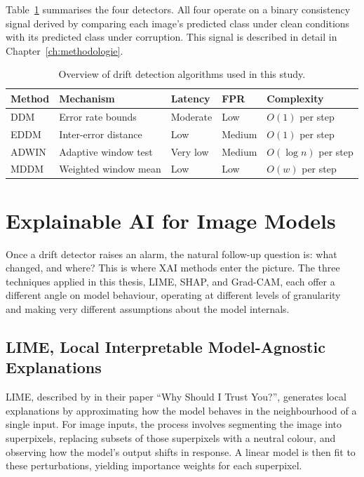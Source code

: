 Table~\ref{tab:detectors} summarises the four detectors. All four operate on a binary consistency signal derived by comparing each image's predicted class under clean conditions with its predicted class under corruption. This signal is described in detail in Chapter~\ref{ch:methodologie}.

\begin{table}[h]
  \centering
  \caption[Drift detectors compared]{Overview of drift detection algorithms used in this study.}
  \label{tab:detectors}
  \small
  \begin{tabular}{lllll}
    \toprule
    \textbf{Method} & \textbf{Mechanism} & \textbf{Latency} & \textbf{FPR} & \textbf{Complexity} \\
    \midrule
    DDM   & Error rate bounds        & Moderate & Low    & $O(1)$ per step \\
    EDDM  & Inter-error distance     & Low      & Medium & $O(1)$ per step \\
    ADWIN & Adaptive window test     & Very low & Medium & $O(\log n)$ per step \\
    MDDM  & Weighted window mean     & Low      & Low    & $O(w)$ per step \\
    \bottomrule
  \end{tabular}
\end{table}

\section{Explainable AI for Image Models}
\label{sec:xai}

Once a drift detector raises an alarm, the natural follow-up question is: what changed, and where? This is where XAI methods enter the picture. The three techniques applied in this thesis, LIME, SHAP, and Grad-CAM, each offer a different angle on model behaviour, operating at different levels of granularity and making very different assumptions about the model internals.

\subsection{LIME, Local Interpretable Model-Agnostic Explanations}

LIME, described by \textcite{Ribeiro2016} in their paper ``Why Should I Trust You?'', generates local explanations by approximating how the model behaves in the neighbourhood of a single input. For image inputs, the process involves segmenting the image into superpixels, replacing subsets of those superpixels with a neutral colour, and observing how the model's output shifts in response. A linear model is then fit to these perturbations, yielding importance weights for each superpixel.

